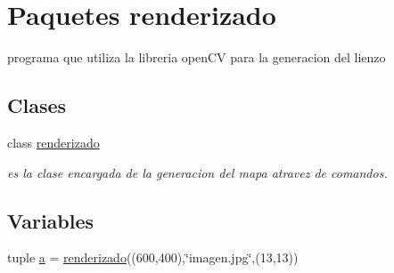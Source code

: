 \hypertarget{namespacerenderizado}{
\section{Paquetes renderizado}
\label{namespacerenderizado}
}


programa que utiliza la libreria openCV para la generacion del lienzo  


\subsection*{Clases}
\begin{DoxyCompactItemize}
\item 
class \hyperlink{classrenderizado_1_1renderizado}{renderizado}
\begin{DoxyCompactList}\small\item\em es la clase encargada de la generacion del mapa atravez de comandos. \end{DoxyCompactList}\end{DoxyCompactItemize}
\subsection*{Variables}
\begin{DoxyCompactItemize}
\item 
tuple \hyperlink{namespacerenderizado_a67d5237e7cc5eff92a6e3b9d4782723e}{a} = \hyperlink{classrenderizado_1_1renderizado}{renderizado}((600,400),\char`\"{}imagen.jpg\char`\"{},(13,13))
\end{DoxyCompactItemize}


